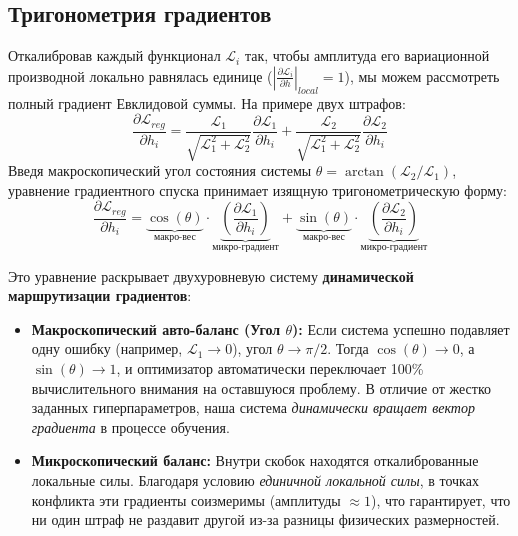 \documentclass[11pt,a4paper]{article}
\begin{document}
\subsection{Тригонометрия градиентов}
Откалибровав каждый функционал $\mathcal{L}_i$ так, чтобы амплитуда его вариационной производной локально равнялась единице ($|\frac{\partial \mathcal{L}_i}{\partial h}|_{local} = 1$), мы можем рассмотреть полный градиент Евклидовой суммы. На примере двух штрафов:
\begin{equation}
\frac{\partial \mathcal{L}_{reg}}{\partial h_i} = \frac{\mathcal{L}_1}{\sqrt{\mathcal{L}_1^2 + \mathcal{L}_2^2}} \frac{\partial \mathcal{L}_1}{\partial h_i} + \frac{\mathcal{L}_2}{\sqrt{\mathcal{L}_1^2 + \mathcal{L}_2^2}} \frac{\partial \mathcal{L}_2}{\partial h_i}
\end{equation}
Введя макроскопический угол состояния системы $\theta = \arctan (\mathcal{L}_2 / \mathcal{L}_1)$, уравнение градиентного спуска принимает изящную тригонометрическую форму:
\begin{equation}
\frac{\partial \mathcal{L}_{reg}}{\partial h_i} = \underbrace{\cos(\theta)}_{\text{макро-вес}} \cdot \underbrace{\left(\frac{\partial \mathcal{L}_1}{\partial h_i}\right)}_{\text{микро-градиент}} + \underbrace{\sin(\theta)}_{\text{макро-вес}} \cdot \underbrace{\left(\frac{\partial \mathcal{L}_2}{\partial h_i}\right)}_{\text{микро-градиент}}
\end{equation}

Это уравнение раскрывает двухуровневую систему \textbf{динамической маршрутизации градиентов}:
\begin{itemize}
    \item \textbf{Макроскопический авто-баланс (Угол $\theta$):} Если система успешно подавляет одну ошибку (например, $\mathcal{L}_1 \to 0$), угол $\theta \to \pi/2$. Тогда $\cos(\theta) \to 0$, а $\sin(\theta) \to 1$, и оптимизатор автоматически переключает 100\% вычислительного внимания на оставшуюся проблему. В отличие от жестко заданных гиперпараметров, наша система \textit{динамически вращает вектор градиента} в процессе обучения.
    \item \textbf{Микроскопический баланс:} Внутри скобок находятся откалиброванные локальные силы. Благодаря условию \textit{единичной локальной силы}, в точках конфликта эти градиенты соизмеримы (амплитуды $\approx 1$), что гарантирует, что ни один штраф не раздавит другой из-за разницы физических размерностей.
\end{itemize}
\end{document}
